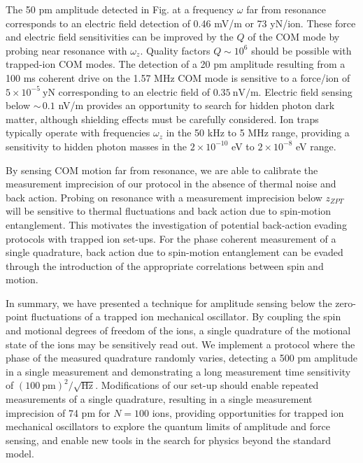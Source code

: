 \documentclass[aps,prl,twocolumn,superscriptaddress,floatfix]{revtex4-1}
\begin{document}
The 50 pm amplitude detected in Fig.  at a frequency $\omega$ far from resonance corresponds to an electric field detection of 0.46 mV/m or 73 yN/ion. These force and electric field sensitivities can be improved by the $Q$ of the COM mode by probing near resonance with $\omega_z$. Quality factors $Q\sim 10^6$ should be possible with trapped-ion COM modes. The detection of a 20 pm amplitude resulting from a 100 ms coherent drive on the 1.57 MHz COM mode is sensitive to a force/ion of $5\times10^{-5}\:\mathrm{yN}$ corresponding to an electric field of $0.35\:\mathrm{nV/m}$. Electric field sensing below ${\sim} \,0.1$ nV/m provides an opportunity to search for hidden photon dark matter, although shielding effects must be carefully considered. Ion traps typically operate with frequencies $\omega_z$ in the 50 kHz to 5 MHz range, providing a sensitivity to hidden photon masses in the $2 \times 10^{-10}$ eV to $2 \times 10^{-8}$ eV range. 

By sensing COM motion far from resonance, we are able to calibrate the measurement imprecision of our protocol in the absence of thermal noise and back action. Probing on resonance with a measurement imprecision below $z_{ZPT}$ will be sensitive to thermal fluctuations and back action due to spin-motion entanglement. This motivates the investigation of potential back-action evading protocols with trapped ion set-ups. For the phase coherent measurement of a single quadrature, back action due to spin-motion entanglement can be evaded through the introduction of the appropriate correlations between spin and motion.

In summary, we have presented a technique for amplitude sensing below the zero-point fluctuations of a trapped ion mechanical oscillator. By coupling
the spin and motional degrees of freedom of the ions, a single quadrature of the motional state of the ions may be sensitively read out. We implement a 
protocol where the phase of the measured quadrature randomly varies, detecting a 500 pm amplitude in a single measurement
and demonstrating a long measurement time sensitivity of $\left(100\:\mathrm{pm}\right)^{2}/\sqrt{\mathrm{Hz}}$. Modifications of our set-up should enable repeated measurements of a single quadrature, resulting in a single measurement
imprecision of 74 pm for $N = 100$ ions, providing opportunities for
trapped ion mechanical oscillators to explore the quantum limits of amplitude and force sensing, and enable new tools in the search for physics beyond the standard model.
\end{document}
